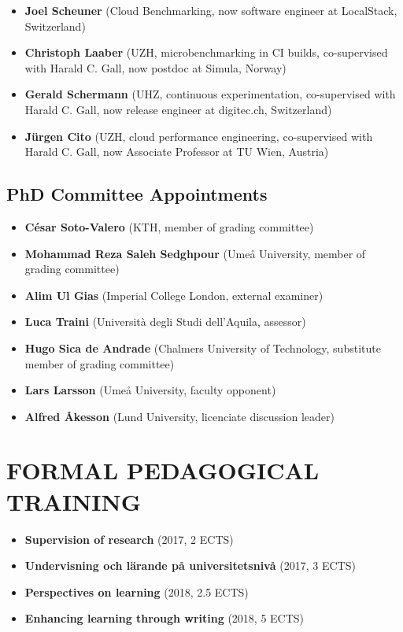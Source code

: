 \documentclass[paper=letter,fontsize=11pt]{scrartcl} %
\newcommand{\NewPart}[2]{\section*{\uppercase{#1} #2}}
\begin{document}
\begin{itemize}
\item \textbf{Joel Scheuner}  (Cloud Benchmarking, now software engineer at LocalStack, Switzerland)
\item \textbf{Christoph Laaber} (UZH, microbenchmarking in CI builds, co-supervised with Harald C. Gall, now postdoc at Simula, Norway)
\item \textbf{Gerald Schermann} (UHZ, continuous experimentation, co-supervised with Harald C. Gall, now release engineer at digitec.ch, Switzerland)
\item \textbf{J\"urgen Cito} (UZH, cloud performance engineering, co-supervised with Harald C. Gall, now Associate Professor at TU Wien, Austria)
\end{itemize}

\subsection*{PhD Committee Appointments}

\begin{itemize}
\item \textbf{César Soto-Valero} (KTH, member of grading committee)
\item \textbf{Mohammad Reza Saleh Sedghpour} (Umeå University, member of grading committee)
\item \textbf{Alim Ul Gias} (Imperial College London, external examiner) 
\item \textbf{Luca Traini} (Università degli Studi dell'Aquila, assessor) 
\item \textbf{Hugo Sica de Andrade} (Chalmers University of Technology, substitute member of grading committee) 
\item \textbf{Lars Larsson} (Umeå University, faculty opponent)
\item \textbf{Alfred Åkesson} (Lund University, licenciate discussion leader)
\end{itemize}

\NewPart{Formal Pedagogical Training}{}

\begin{itemize}
\item \textbf{Supervision of research} (2017, 2 ECTS)
\item \textbf{Undervisning och lärande på universitetsnivå}  (2017, 3 ECTS)
\item \textbf{Perspectives on learning}  (2018, 2.5 ECTS)
\item \textbf{Enhancing learning through writing} (2018, 5 ECTS)
\end{itemize}
\end{document}
